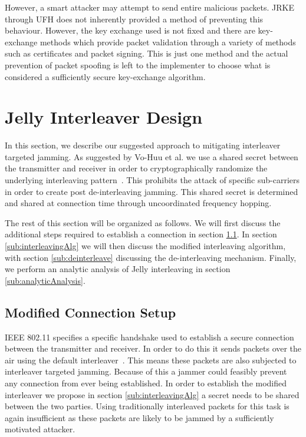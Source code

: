 \documentclass[sigconf]{acmart}
\begin{document}
However, a smart attacker may attempt to send entire malicious packets. JRKE through UFH does not inherently provided a method of preventing this behaviour. However, the key exchange used is not fixed and there are key-exchange methods which provide packet validation through a variety of methods such as certificates and packet signing. This is just one method and the actual prevention of packet spoofing is left to the implementer to choose what is considered a sufficiently secure key-exchange algorithm.

\section{Jelly Interleaver Design}
\label{sec:interleaver_design}

In this section, we describe our suggested approach to mitigating interleaver targeted jamming. As suggested by Vo-Huu et al. we use a shared secret between the transmitter and receiver in order to cryptographically randomize the underlying interleaving pattern~\cite{vo2016interleaving}. This prohibits the attack of specific sub-carriers in order to create post de-interleaving jamming. This shared secret is determined and shared at connection time through uncoordinated frequency hopping. 

The rest of this section will be organized as follows. We will first discuss the additional steps required to establish a connection in section \ref{sub:setup}. In section \ref{sub:interleavingAlg} we will then discuss the modified interleaving algorithm, with section \ref{sub:deinterleave} discussing the de-interleaving mechanism. Finally, we perform an analytic analysis of Jelly interleaving in section \ref{sub:analyticAnalysis}.

\subsection{Modified Connection Setup}
\label{sub:setup}

IEEE 802.11 specifies a specific handshake used to establish a secure connection between the transmitter and receiver. In order to do this it sends packets over the air using the default interleaver~\cite{cooklev2004wireless}. This means these packets are also subjected to interleaver targeted jamming. Because of this a jammer could feasibly prevent any connection from ever being established. In order to establish the modified interleaver we propose in section \ref{sub:interleavingAlg} a secret needs to be shared between the two parties. Using traditionally interleaved packets for this task is again insufficient as these packets are likely to be jammed by a sufficiently motivated attacker. 
\end{document}
